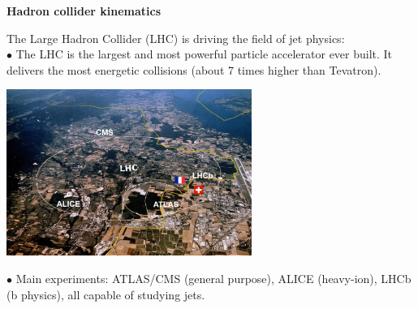 \documentclass[9pt,a4paper,unknownkeysallowed,xcolor=dvipsnames,aspectratio=43]{beamer}
\begin{document}
%
%
\begin{frame}{\bf\huge Hadron collider kinematics}

{\color{red}The Large Hadron Collider (LHC)} is driving the field of jet physics:\\
\vspace{2mm}
{\color{darkred}\Large$\bullet$} The LHC is the largest and most powerful particle accelerator ever built. It delivers the {\color{darkred}most energetic collisions} (about 7 times higher than Tevatron).
\vspace{2mm}
\begin{center}
\includegraphics[width=0.6\textwidth]{LHC.png}
\end{center}
\vspace{2mm}
{\color{darkred}\Large$\bullet$} {\color{darkred} Main experiments:} ATLAS/CMS (general purpose), ALICE (heavy-ion), LHCb (b physics), all capable of studying jets.
\end{frame}
%
%
\end{document}
